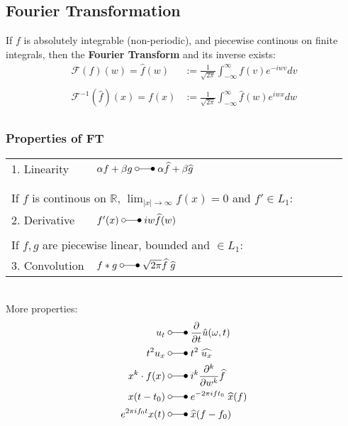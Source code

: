 \subsection{Fourier Transformation}
If $f$ is absolutely integrable (non-periodic), and piecewise continous on finite integrals, 
then the \textbf{Fourier Transform} and its inverse exists:
\begin{align*}
    \mathcal{F}(f)(w)=\widehat{f}(w)&:=\frac1{\sqrt{2\pi}}\int_{-\infty}^{\infty}f(v)e^{-iwv}dv\\\\
    \mathcal{F}^{-1}(\widehat{f})(x)=f(x)&:=\frac1{\sqrt{2\pi}}\int_{-\infty}^{\infty}\widehat{f}(w)e^{iwx}dw\\
\end{align*}
\subsubsection{Properties of FT}

\begin{tabular}[h]{p{0.25\linewidth} p{0.74\linewidth}}
    1. Linearity & $\alpha f+\beta g\;\laplace\;\alpha\widehat{f}+\beta\widehat{g}$\\
    &\\
    &\\
    \multicolumn{2}{p{0.9\linewidth}}{If $f$ is continous on $\mathbb{R}$, $\lim_{|x|\to\infty}f(x)=0$ and $f'\in L_1$:}\\
    2. Derivative & $f^{\prime}(x)\;\laplace\;iw\widehat{f}(w)$\\
    &\\
    \multicolumn{2}{p{0.9\linewidth}}{If $f,g$ are piecewise linear, bounded and $\in L_1$:}\\
    3. Convolution & $f*g\;\laplace\;\sqrt{2\pi}\widehat{f}\;\widehat{g}$\\
\end{tabular}\vspace*{8pt}\\
More properties:
\begin{align*}
    u_t&\;\laplace\;\frac\partial{\partial t}\hat{u}(\omega,t) \\
    t^2u_x&\;\laplace\; t^2\;\widehat{u_x} \\
    x^k\cdot f(x)&\;\laplace\;i^k \frac{\partial^k}{\partial w^k}\widehat{f} \\
    x(t-t_0)&\;\laplace\; e^{-2\pi ift_0}\;\widehat{x}(f)\\
    e^{2\pi if_0t}x(t) &\;\laplace\; \widehat{x}(f-f_0)
\end{align*}

